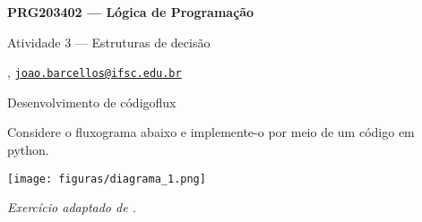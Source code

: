 





\begin{Large}
    \textbf{PRG203402 --- Lógica de Programação}
    
    Atividade 3 --- Estruturas de decisão \hfill {}
\end{Large}

\vspace{1ex}
\textbf{} , \href{mailto:joao.barcellos@ifsc.edu.br}{\texttt{joao.barcellos@ifsc.edu.br}}\\
\textbf{}


\vspace{2ex}

\begin{problem}{Desenvolvimento de código}{flux}

Considere o fluxograma abaixo e implemente-o por meio de um código em python.

\begin{center}
    \texttt{[image: figuras/diagrama\_1.png]}
\end{center}

\textit{\footnotesize Exercício adaptado de \cite{uninove_2013}.}

\end{problem}

\newpage

\printbibliography


